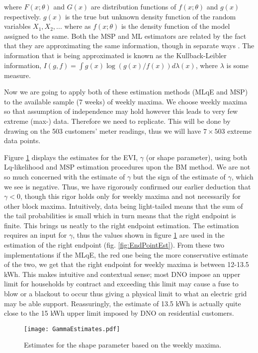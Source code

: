 \noindent where $F(x;\theta)$ and $G(x)$ are distribution functions of $f(x;\theta)$ and $g(x)$ respectively. $g(x)$ is the true but unknown density function of the random variables $X_1, X_2, ... $ where as $f(x;\theta)$ is the density function of the model assigned to the same. Both the MSP and ML estimators are related by the fact that they are approximating the same information, though in separate ways \citep{Ranneby:84}. The information that is being approximated is known as the Kullback-Leibler information, $I(g,f) = \int g(x)\log( g(x)/f(x) ) d\lambda(x)$, where $\lambda$ is some measure. 

Now we are going to apply both of these estimation methods (MLqE and MSP) to the available sample (7 weeks) of weekly maxima. We choose weekly maxima so that assumption of independence may hold however this leads to very few extreme (max-) data. Therefore we need to replicate. This will be done by drawing on the 503 customers' meter readings, thus we will have $7 \times 503$ extreme data points.

Figure \ref{fig:gammaEst} displays the estimates for the EVI, $\gamma$ (or shape parameter), using both Lq-likelihood and MSP estimation procedures upon the BM method. We are not so much concerned with the estimate of $\gamma$ but the sign of the estimate of $\gamma$, which we see is negative. Thus, we have rigorously confirmed our earlier deduction that $\gamma <0$, though this rigor holds only for weekly maxima and not necessarily for other block maxima. Intuitively, data being light-tailed means that the sum of the tail probabilities is small which in turn means that the right endpoint is finite. This brings us neatly to the right endpoint estimation. The estimation requires an input for $\gamma$, thus the values shown in figure \ref{fig:gammaEst} are used in the estimation of the right endpoint (fig. \ref{fig:EndPointEst}). From these two implementations if the MLqE, the red one being the more conservative estimate of the two, we get that the right endpoint for weekly maxima is between 12-13.5 kWh. This makes intuitive and contextual sense; most DNO impose an upper limit for households by contract and exceeding this limit may cause a fuse to blow or a blackout to occur thus giving a physical limit to what an electric grid may be able support.  Reassuringly, the estimate of 13.5 kWh is actually quite close to the 15 kWh upper limit imposed by DNO on residential customers.

\begin{figure}
\begin{center}
\texttt{[image: GammaEstimates.pdf]}
\caption{Estimates for the shape parameter based on the weekly maxima.} \label{fig:gammaEst}
\end{center}
\end{figure}

